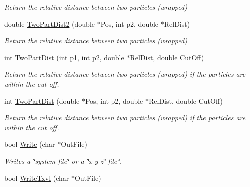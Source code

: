 \begin{DoxyCompactItemize}
\begin{DoxyCompactList}\small\item\em Return the relative distance between two particles (wrapped) \end{DoxyCompactList}\item 
double \hyperlink{classVarData_ac18654b4b07d2480609388a671319d76}{Two\+Part\+Dist2} (double $\ast$Pos, int p2, double $\ast$Rel\+Dist)\hypertarget{classVarData_ac18654b4b07d2480609388a671319d76}{}\label{classVarData_ac18654b4b07d2480609388a671319d76}

\begin{DoxyCompactList}\small\item\em Return the relative distance between two particles (wrapped) \end{DoxyCompactList}\item 
int \hyperlink{classVarData_a72b2b49ea5c00c2902e419ff8ec9a095}{Two\+Part\+Dist} (int p1, int p2, double $\ast$Rel\+Dist, double Cut\+Off)\hypertarget{classVarData_a72b2b49ea5c00c2902e419ff8ec9a095}{}\label{classVarData_a72b2b49ea5c00c2902e419ff8ec9a095}

\begin{DoxyCompactList}\small\item\em Return the relative distance between two particles (wrapped) if the particles are within the cut off. \end{DoxyCompactList}\item 
int \hyperlink{classVarData_a7ecd9d43c45ae675e71f9b926673c8e4}{Two\+Part\+Dist} (double $\ast$Pos, int p2, double $\ast$Rel\+Dist, double Cut\+Off)\hypertarget{classVarData_a7ecd9d43c45ae675e71f9b926673c8e4}{}\label{classVarData_a7ecd9d43c45ae675e71f9b926673c8e4}

\begin{DoxyCompactList}\small\item\em Return the relative distance between two particles (wrapped) if the particles are within the cut off. \end{DoxyCompactList}\item 
bool \hyperlink{classVarData_a054aab836dcf7735720ef32e0b8f7ecb}{Write} (char $\ast$Out\+File)\hypertarget{classVarData_a054aab836dcf7735720ef32e0b8f7ecb}{}\label{classVarData_a054aab836dcf7735720ef32e0b8f7ecb}

\begin{DoxyCompactList}\small\item\em Writes a \char`\"{}system-\/file\char`\"{} or a \char`\"{}x y z\char`\"{} file". \end{DoxyCompactList}\item 
bool \hyperlink{classVarData_a76873542f36c8e36b790c90273c95cf1}{Write\+Txvl} (char $\ast$Out\+File)\hypertarget{classVarData_a76873542f36c8e36b790c90273c95cf1}{}\label{classVarData_a76873542f36c8e36b790c90273c95cf1}


\end{DoxyCompactItemize}
